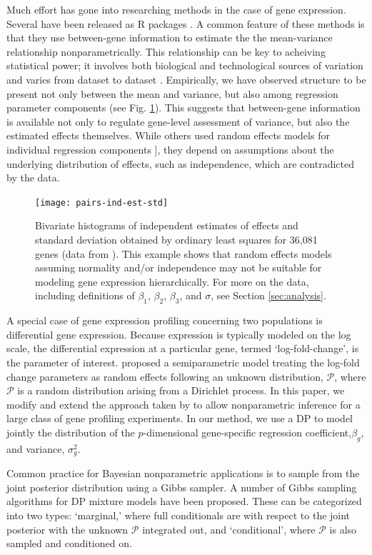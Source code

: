Much effort has gone into researching methods in the case of gene expression. Several have been released as R packages \citep{edger2010,deseq2014,voom}. A common feature of these methods is that they use between-gene information to estimate the the  mean-variance relationship nonparametrically. This relationship can be key to acheiving statistical power; it involves both biological and technological sources of variation and varies from dataset to dataset \citep{voom}. Empirically, we have observed structure to be present not only between the mean and variance, but also among regression parameter components (see Fig. \ref{pairs-ind-est}). This suggests that between-gene information is available not only to regulate gene-level assessment of variance, but also the estimated effects themselves. While others used random effects models for individual regression components \citep{deseq2014,landau}], they depend on assumptions about the underlying distribution of effects, such as independence, which are contradicted by the data.

\begin{figure}[ht]
\centering
\texttt{[image: pairs-ind-est-std]}
\caption{Bivariate histograms of independent estimates of effects and standard deviation obtained by ordinary least squares for 36,081 genes (data from \cite{paschold}). This example shows that random effects models assuming normality and/or independence may not be suitable for modeling gene expression hierarchically. For more on the data, including definitions of $\beta_1$, $\beta_2$, $\beta_3$, and $\sigma$, see Section \ref{sec:analysis}.}
\label{pairs-ind-est}
\end{figure}

A special case of gene expression profiling concerning two populations is differential gene expression. Because expression is typically modeled on the log scale, the differential expression at a particular gene, termed `log-fold-change', is the parameter of interest. \citet{liu} proposed a semiparametric model treating the log-fold change parameters as random effects following an unknown distribution, $\mathcal{P}$, where $\mathcal{P}$ is a random distribution arising from a Dirichlet process. In this paper, we modify and extend the approach taken by \cite{liu} to allow nonparametric inference for a large class of gene profiling experiments. In our method, we use a DP to model jointly the distribution of the $p$-dimensional gene-specific regression coefficient,$\beta_g$, and variance, $\sigma^2_g$.

Common practice for Bayesian nonparametric applications is to sample from the joint posterior distribution using a Gibbs sampler. A number of Gibbs sampling algorithms for DP mixture models have been proposed. These can be categorized into two types: `marginal,' where full conditionals are with respect to the joint posterior with the unknown $\mathcal{P}$ integrated out, and `conditional', where $\mathcal{P}$ is also sampled and conditioned on.

